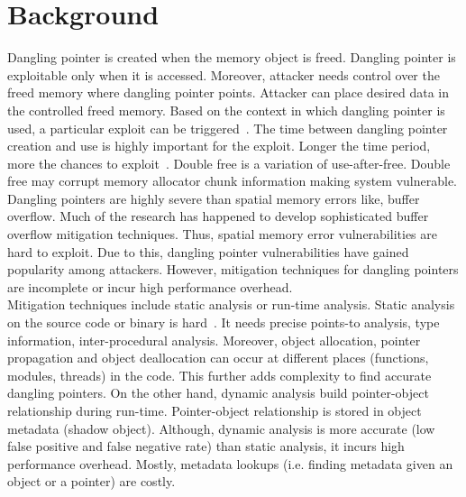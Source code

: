 \section{Background}

Dangling pointer is created when the memory object is freed. Dangling pointer is exploitable only when it is accessed. Moreover, attacker needs control over the freed memory where dangling pointer points. Attacker can place desired data in the controlled freed memory. Based on the context in which dangling pointer is used, a particular exploit can be triggered~\cite{CVEMitre, NVDNist}. The time between dangling pointer creation and use is highly important for the exploit. Longer the time period, more the chances to exploit~\cite{danglingptrfun, caballero2012undangle}.  Double free is a variation of use-after-free. Double free may corrupt memory allocator chunk information making system vulnerable. Dangling pointers are highly severe than spatial memory errors like, buffer overflow. Much of the research has happened to develop sophisticated buffer overflow mitigation techniques. Thus, spatial memory error vulnerabilities are hard to exploit. Due to this, dangling pointer vulnerabilities have gained popularity among attackers. However, mitigation techniques for dangling pointers are incomplete or incur high performance overhead. \\

Mitigation techniques include static analysis or run-time analysis. Static analysis   on the source code or binary is hard~\cite{feist2014statically}. It needs precise points-to analysis, type information, inter-procedural analysis. Moreover, object allocation, pointer propagation and object deallocation can occur at different places (functions, modules, threads) in the code. This further adds complexity to find accurate dangling pointers. On the other hand, dynamic analysis build pointer-object relationship during run-time. Pointer-object relationship is stored in object metadata (shadow object). Although, dynamic analysis is more accurate (low false positive and false negative rate) than static analysis, it incurs high performance overhead. Mostly, metadata lookups (i.e. finding metadata given an object or a pointer) are costly. \\

